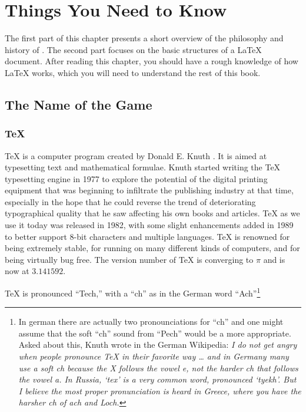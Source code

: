  
\chapter{Things You Need to Know}
\begin{intro}
The first part of this chapter presents a short 
overview of the philosophy and history of \LaTeXe. The second part
focuses on the basic structures of a \LaTeX{} document. 
After reading this chapter, you should have a rough knowledge
of how \LaTeX{} works, which you will need to understand the rest
of this book.  
\end{intro}

\section{The Name of the Game}
\subsection{\TeX}
 
\TeX{} is a computer program created by Donald
E. Knuth \cite{texbook}. It is aimed at typesetting text and
mathematical formulae. Knuth started writing the \TeX{} typesetting
engine in 1977 to explore the potential of the digital printing
equipment that was beginning to infiltrate the publishing industry at
that time, especially in the hope that he could reverse the trend of
deteriorating typographical quality that he saw affecting his own
books and articles. \TeX{} as we use it today was released in 1982,
with some slight enhancements added in 1989 to better support 8-bit
characters and multiple languages. \TeX{} is renowned for being
extremely stable, for running on many different kinds of computers,
and for being virtually bug free. The version number of \TeX{} is
converging to $\pi$ and is now at $3.141592$.
                                                                       
\TeX{} is pronounced ``Tech,'' with a ``ch'' as in the German word
``Ach''\footnote{In german there are actually two pronounciations for ``ch''
and one might assume that the soft ``ch'' sound from ``Pech'' would be a
more appropriate. Asked about this, Knuth wrote in the German Wikipedia:
\emph{I do not get angry when people pronounce \TeX{} in their favorite way
\ldots{} and in Germany many use a soft ch because the X follows the vowel
e, not the harder ch that follows the vowel a. In Russia, `tex' is a very
common word, pronounced `tyekh'. But I believe the most proper pronunciation
is heard in Greece, where you have the harsher ch of ach and Loch.}}

